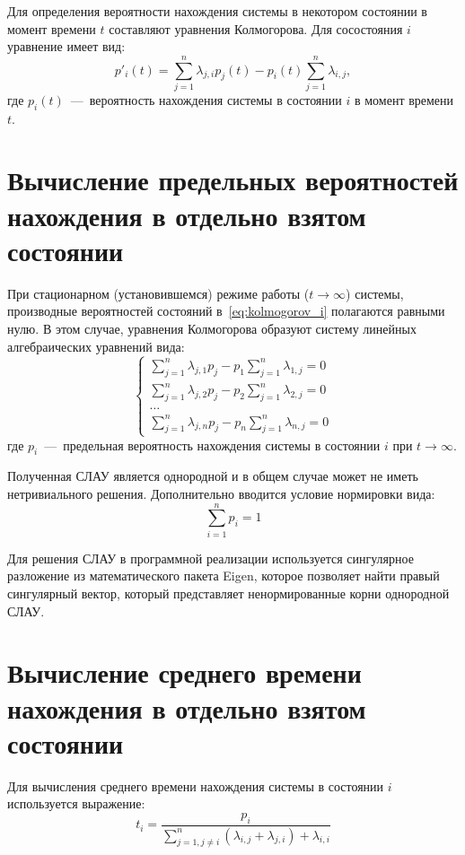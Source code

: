 Для определения вероятности нахождения системы в некотором состоянии в момент времени $t$ составляют уравнения Колмогорова. Для сосостояния $i$ уравнение имеет вид:
\begin{equation}
    \label{eq:kolmogorov_i}
    p'_{i}(t) = \sum_{j=1}^{n} \lambda_{j,i}p_{j}(t) - p_{i}(t) \sum_{j=1}^{n}\lambda_{i,j},
\end{equation}
где $p_{i}(t)$~---~вероятность нахождения системы в состоянии $i$ в момент времени $t$.

\section{Вычисление предельных вероятностей нахождения в отдельно взятом состоянии}
При стационарном (установившемся) режиме работы ($t\rightarrow\infty$) системы, производные вероятностей состояний в~\ref{eq:kolmogorov_i} полагаются равными нулю. В этом случае, уравнения Колмогорова образуют систему линейных алгебраических уравнений вида:
\begin{equation}
    \begin{cases}
        \sum_{j=1}^{n} \lambda_{j,1}p_{j} - p_{1} \sum_{j=1}^{n}\lambda_{1,j} = 0 \\
        \sum_{j=1}^{n} \lambda_{j,2}p_{j} - p_{2} \sum_{j=1}^{n}\lambda_{2,j} = 0 \\
        \dots \\
        \sum_{j=1}^{n} \lambda_{j,n}p_{j} - p_{n} \sum_{j=1}^{n}\lambda_{n,j} = 0
    \end{cases}
\end{equation}
где $p_i$~---~предельная вероятность нахождения системы в состоянии $i$ при $t\rightarrow\infty$.

Полученная СЛАУ является однородной и в общем случае может не иметь нетривиального решения. Дополнительно вводится условие нормировки вида:
\begin{equation}
    \sum_{i=1}^{n}p_{i} = 1
\end{equation}

Для решения СЛАУ в программной реализации используется сингулярное разложение из математического пакета Eigen, которое позволяет найти правый сингулярный вектор, который представляет ненормированные корни однородной СЛАУ.

\section{Вычисление среднего времени нахождения в отдельно взятом состоянии}
Для вычисления среднего времени нахождения системы в состоянии $i$ используется выражение:
\begin{equation}
    t_i = \frac{p_i}{\sum_{j=1, j \ne i}^{n}(\lambda_{i, j}+\lambda_{j, i})+\lambda_{i, i}}
\end{equation}

